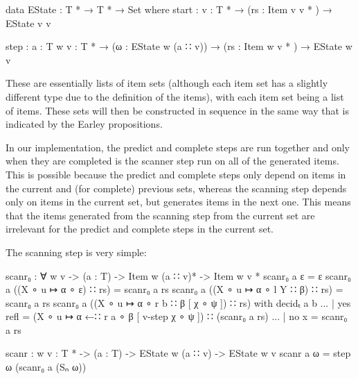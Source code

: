		\begin{code}
			  data EState : T * → T * → Set where
			    start : {v : T *} →
			      (rs : Item v v * ) →
			      EState v v

			    step : {a : T} {w v : T *} →
			      (ω : EState w (a ∷ v)) →
			      (rs : Item w v * ) →
			      EState w v
		\end{code}

		These are essentially lists of item sets (although each item set has a
		slightly different type due to the definition of the items), with each
		item set being a list of items. These sets will then be constructed in
		sequence in the same way that is indicated by the Earley propositions.

		In our implementation, the predict and complete steps are run together
		and only when they are completed is the scanner step run on all of the
		generated items. This is possible because the predict and complete
		steps only depend on items in the current and (for complete) previous
		sets, whereas the scanning step depends only on items in the current
		set, but generates items in the next one. This means that the items
		generated from the scanning step from the current set are irrelevant
		for the predict and complete steps in the current set.

		The scanning step is very simple:

		\begin{code}
			  scanr₀ : ∀ {w v} ->
			    (a : T) ->
			    Item w (a ∷ v)* ->
			    Item w v *
			  scanr₀ a ε = ε
			  scanr₀ a ((X ∘ u ↦ α ∘ ε) ∷ rs) = scanr₀ a rs
			  scanr₀ a ((X ∘ u ↦ α ∘ l Y ∷ β) ∷ rs) = scanr₀ a rs
			  scanr₀ a ((X ∘ u ↦ α ∘ r b ∷ β [ χ ∘ ψ ]) ∷ rs) with decidₜ a b
			  ... | yes refl = (X ∘ u ↦ α ←∷ r a ∘ β [ v-step χ ∘ ψ ]) ∷ (scanr₀ a rs)
			  ... | no x = scanr₀ a rs

			  scanr : {w v : T *} ->
			    (a : T) ->
			    EState w (a ∷ v) ->
			    EState w v
			  scanr a ω = step ω (scanr₀ a (Sₙ ω))
		\end{code}

